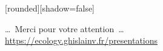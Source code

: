 
{
  [rounded][shadow=false]
  \begin{frame}[plain]
    \begin{block}{}
      \begin{center}
        \ldots~Merci pour votre attention~\ldots \\
        \url{https://ecology.ghislainv.fr/presentations}
      \end{center}
    \end{block}
  \end{frame}
}